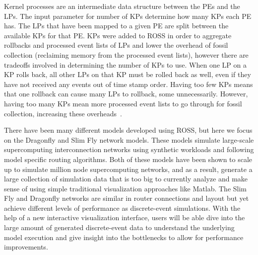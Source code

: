 \documentclass{acm_proc_article-sp}
\begin{document}
Kernel processes are an intermediate data structure between the PEs and the LPs.  The input parameter for number of KPs determine how many KPs each PE has.  The LPs that have been mapped to a given PE are split between the available KPs for that PE.  KPs were added to ROSS in order to aggregate rollbacks and processed event lists of LPs and lower the overhead of fossil collection (reclaiming memory from the processed event lists), however there are tradeoffs involved in determining the number of KPs to use.  When one LP on a KP rolls back, all other LPs on that KP must be rolled back as well, even if they have not received any events out of time stamp order.  Having too few KPs means that one rollback can cause many LPs to rollback, some unnecessarily.  However, having too many KPs mean more processed event lists to go through for fossil collection, increasing these overheads~\cite{carothers, Bauer}.  

There have been many different models developed using ROSS, but here we focus on the Dragonfly \cite{Dragonfly} and Slim Fly \cite{slimfly} network models. These models simulate large-scale supercomputing interconnection networks using synthetic workloads and following model specific routing algorithms. Both of these models have been shown to scale up to simulate million node supercomputing networks, and as a result, generate a large collection of simulation data that is too big to currently analyze and make sense of using simple traditional visualization approaches like Matlab. The Slim Fly and Dragonfly networks are similar in router connections and layout but yet achieve different levels of performance as discrete-event simulations. With the help of a new interactive visualization interface, users will be able dive into the large amount of generated discrete-event data to understand the underlying model execution and give insight into the bottlenecks to allow for performance improvements.
\end{document}
